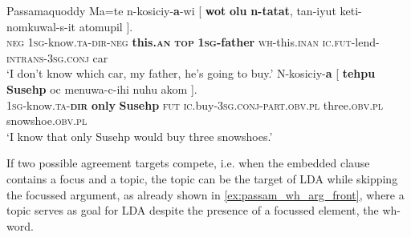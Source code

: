 \documentclass[output=paper
,modfonts
,nonflat]{langsci/langscibook}
\begin{document}
\begin{exe}
\ex Passamaquoddy \citep[][282]{Bruening2001a}
	\xlist
	\ex \label{ex:passam_topmark}
		\gll Ma=te n-kosiciy-\textbf{a}-wi [ \textbf{wot} \textbf{olu} \textbf{n-tatat}, tan-iyut keti-nomkuwal-s-it atomupil ].\\
			 \textsc{neg} \textsc{1sg}-know.\textsc{ta-dir-neg} {} \textbf{this.\textsc{an}} \textbf{\textsc{top}} \textbf{\textsc{1sg}-father} \textsc{wh}-this.\textsc{inan} \textsc{ic.fut}-lend-\textsc{intrans-3sg.conj} car\\
		\glt `I don't know which car, my father, he's going to buy.'
	\ex \label{ex:passam_focmark}
		\gll N-kosiciy-\textbf{a} [ \textbf{tehpu} \textbf{Susehp} oc menuwa-c-ihi nuhu akom ].\\
			 \textsc{1sg}-know.\textsc{ta-\textbf{dir}} {} \textbf{only} \textbf{Susehp} \textsc{fut} \textsc{ic}.buy-\textsc{3sg.conj-part.obv.pl} three.\textsc{obv.pl} snowshoe.\textsc{obv.pl}\\
		\glt `I know that only Susehp would buy three snowshoes.'
	\endxlist
\end{exe}
If two possible agreement targets compete, i.e. when the embedded clause contains a focus and a topic, the topic can be the target of LDA while skipping the focussed argument, as already shown in \ref{ex:passam_wh_arg_front}, where a topic serves as goal for LDA despite the presence of a focussed element, the wh-word.
\end{document}
